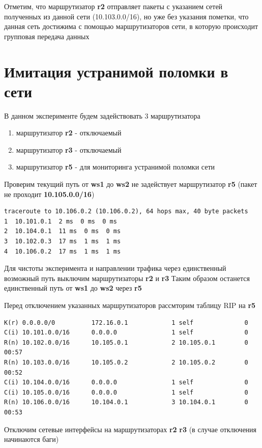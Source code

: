 \documentclass[a4paper,12pt]{article}
\begin{document}
Отметим, что маршрутизатор \textbf{r2} отправляет пакеты с указанием сетей полученных из данной сети (10.103.0.0/16), но уже без указания пометки,
что данная сеть достижима с помощью маршрутизаторов сети, в которую происходит групповая передача данных

\section{Имитация устранимой поломки в сети}

В данном эксперименте будем задействовать 3 маршрутизатора
\begin{enumerate}
    \item маршрутизатор \textbf{r2} - отключаемый
    \item маршрутизатор \textbf{r3} - отключаемый
    \item маршрутизатор \textbf{r5} - для мониторинга устранимой поломки сети
\end{enumerate}

Проверим текущий путь от \textbf{ws1} до \textbf{ws2} не задействует маршрутизатор \textbf{r5} (пакет не проходит \textbf{10.105.0.0/16})
\begin{verbatim}
traceroute to 10.106.0.2 (10.106.0.2), 64 hops max, 40 byte packets
1  10.101.0.1  2 ms  0 ms  0 ms
2  10.104.0.1  11 ms  0 ms  0 ms
3  10.102.0.3  17 ms  1 ms  1 ms
4  10.106.0.2  17 ms  1 ms  1 ms   
\end{verbatim}

Для чистоты эксперимента и направлении трафика через единственный возможный путь выключим маршрутизаторы \textbf{r2} и \textbf{r3}
Таким образом останется единственный путь от \textbf{ws1} до \textbf{ws2} через \textbf{r5}

Перед отключением указанных маршрутизаторов рассмторим таблицу RIP на \textbf{r5}
\begin{verbatim}
K(r) 0.0.0.0/0          172.16.0.1            1 self              0
C(i) 10.101.0.0/16      0.0.0.0               1 self              0
R(n) 10.102.0.0/16      10.105.0.1            2 10.105.0.1        0 00:57
R(n) 10.103.0.0/16      10.105.0.2            2 10.105.0.2        0 00:52
C(i) 10.104.0.0/16      0.0.0.0               1 self              0
C(i) 10.105.0.0/16      0.0.0.0               1 self              0
R(n) 10.106.0.0/16      10.104.0.1            3 10.104.0.1        0 00:53    
\end{verbatim}

Отключим сетевые интерфейсы на маршрутизаторах \textbf{r2} \textbf{r3} (в случае отключения начинаются баги)
\end{document}
